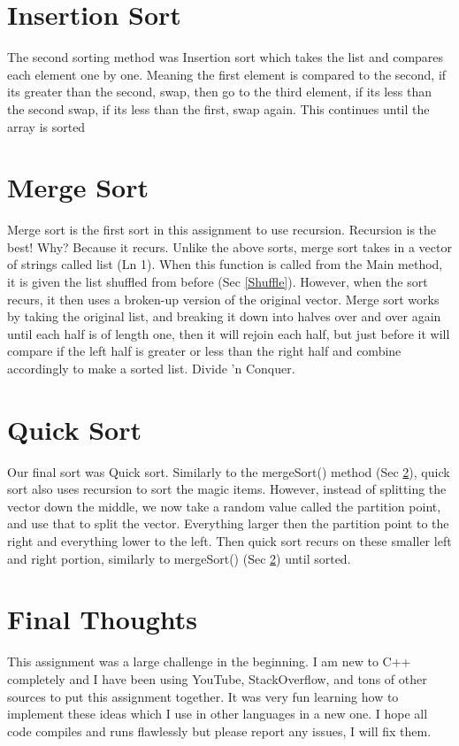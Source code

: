 \documentclass[12pt, letterpaper]{article}
\begin{document}
\section{Insertion Sort} \label{Insertion}
The second sorting method was Insertion sort which takes the list and compares each element one by one. Meaning the first element is compared to the second, if its greater than the second, swap, then go to the third element, if its less 
than the second swap, if its less than the first, swap again. This continues until the array is sorted


\section{Merge Sort} \label{Merge}
Merge sort is the first sort in this assignment to use recursion. Recursion is the best! Why? Because it recurs. Unlike the above sorts, merge sort takes in a vector of strings called list (Ln 1). When this function is called from the Main method,
it is given the list shuffled from before (Sec \ref{Shuffle}). However, when the sort recurs, it then uses a broken-up version of the original vector. Merge sort works by taking the original list, and breaking it down into halves over and over again until
each half is of length one, then it will rejoin each half, but just before it will compare if the left half is greater or less than the right half and combine accordingly to make a sorted list. Divide 'n Conquer.


\section{Quick Sort} \label{Quick}
Our final sort was Quick sort. Similarly to the mergeSort() method (Sec \ref{Merge}), quick sort also uses recursion to sort the magic items. However, instead of splitting the vector down the middle, we now take a random value called the partition point, 
and use that to split the vector. Everything larger then the partition point to the right and everything lower to the left. Then quick sort recurs on these smaller left and right portion, similarly to mergeSort() (Sec \ref{Merge}) until sorted. 


\section{Final Thoughts} \label{Final}
This assignment was a large challenge in the beginning. I am new to C++ completely and I have been using YouTube, StackOverflow, and tons of other sources to put this assignment together. It was very fun learning how to implement 
these ideas which I use in other languages in a new one. I hope all code compiles and runs flawlessly but please report any issues, I will fix them. 
\end{document}
